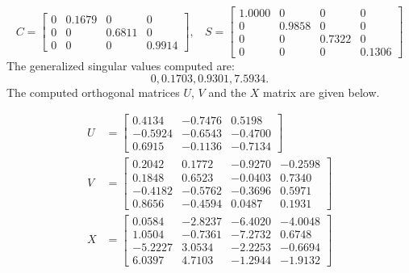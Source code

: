 \begin{example}
{\begin{enumerate}[(1).]
            \begin{equation*}
                C = \begin{bmatrix}
                     0   & 0.1679  &       0  &       0 \\
                     0   &      0  &  0.6811  &       0 \\
                     0   &      0  &       0  &  0.9914
                \end{bmatrix}, \ \ \ \
                S = \begin{bmatrix}
                    1.0000  &       0  &       0  &       0 \\
                         0  &  0.9858  &       0  &       0 \\
                         0  &       0  &  0.7322  &       0 \\
                         0  &       0  &       0  &  0.1306
                \end{bmatrix}
            \end{equation*}
            The generalized singular values computed are: 
\[ 
0, 0.1703, 0.9301, 7.5934.
\] 
The computed orthogonal matrices $U$, $V$ and the $X$ matrix are given below.
    
            \begin{align*}
                U &= \begin{bmatrix}
                    0.4134 &  -0.7476 &   0.5198 \\
                   -0.5924 &  -0.6543 &  -0.4700 \\
                    0.6915 &  -0.1136 &  -0.7134
                \end{bmatrix} \\
                V &= \begin{bmatrix}
                    0.2042 &   0.1772 &  -0.9270 &  -0.2598 \\
                    0.1848 &   0.6523 &  -0.0403 &   0.7340 \\
                   -0.4182 &  -0.5762 &  -0.3696 &   0.5971 \\
                    0.8656 &  -0.4594 &   0.0487 &   0.1931
                \end{bmatrix} \\
                X &= \begin{bmatrix}
                    0.0584 &  -2.8237  & -6.4020 &  -4.0048 \\
                    1.0504 &  -0.7361  & -7.2732 &   0.6748 \\
                   -5.2227 &   3.0534  & -2.2253 &  -0.6694 \\ 
                    6.0397 &   4.7103  & -1.2944 &  -1.9132
                \end{bmatrix} 
            \end{align*} 
 

\end{enumerate}}
\end{example}
